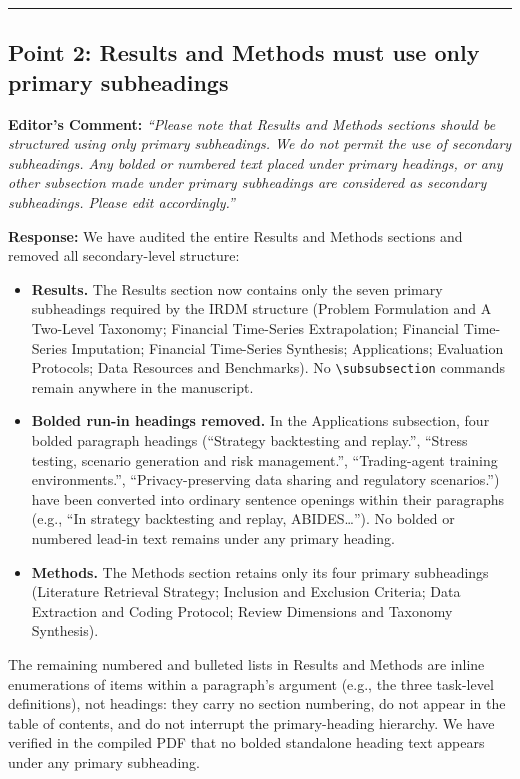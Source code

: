 \documentclass[11pt,a4paper]{article}
\begin{document}
\vspace{1.5em}
\hrule
\vspace{1.5em}

\subsection*{Point 2: Results and Methods must use only primary subheadings}

\vspace{0.5em}
\noindent\textbf{Editor's Comment:}
\textit{``Please note that Results and Methods sections should be structured using only primary subheadings. We do not permit the use of secondary subheadings. Any bolded or numbered text placed under primary headings, or any other subsection made under primary subheadings are considered as secondary subheadings. Please edit accordingly.''}

\vspace{0.5em}
\noindent\textbf{Response:}
We have audited the entire Results and Methods sections and removed all secondary-level structure:

\begin{itemize}
  \item \textbf{Results.} The Results section now contains only the seven primary subheadings required by the IRDM structure (Problem Formulation and A Two-Level Taxonomy; Financial Time-Series Extrapolation; Financial Time-Series Imputation; Financial Time-Series Synthesis; Applications; Evaluation Protocols; Data Resources and Benchmarks). No \texttt{\textbackslash subsubsection} commands remain anywhere in the manuscript.
  \item \textbf{Bolded run-in headings removed.} In the Applications subsection, four bolded paragraph headings (``Strategy backtesting and replay.'', ``Stress testing, scenario generation and risk management.'', ``Trading-agent training environments.'', ``Privacy-preserving data sharing and regulatory scenarios.'') have been converted into ordinary sentence openings within their paragraphs (e.g., ``In strategy backtesting and replay, ABIDES\ldots''). No bolded or numbered lead-in text remains under any primary heading.
  \item \textbf{Methods.} The Methods section retains only its four primary subheadings (Literature Retrieval Strategy; Inclusion and Exclusion Criteria; Data Extraction and Coding Protocol; Review Dimensions and Taxonomy Synthesis).
\end{itemize}

\noindent The remaining numbered and bulleted lists in Results and Methods are inline enumerations of items within a paragraph's argument (e.g., the three task-level definitions), not headings: they carry no section numbering, do not appear in the table of contents, and do not interrupt the primary-heading hierarchy. We have verified in the compiled PDF that no bolded standalone heading text appears under any primary subheading.
\end{document}
